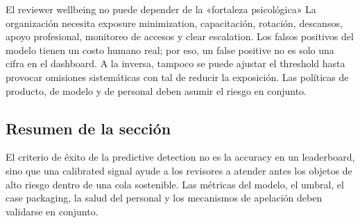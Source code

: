 \begin{warningbox}{El reviewer wellbeing no puede depender de la «fortaleza psicológica»}
La organización necesita exposure minimization, capacitación, rotación, descansos, apoyo profesional, monitoreo de accesos y clear escalation. Los falsos positivos del modelo tienen un costo humano real; por eso, un false positive no es solo una cifra en el dashboard. A la inversa, tampoco se puede ajustar el threshold hasta provocar omisiones sistemáticas con tal de reducir la exposición. Las políticas de producto, de modelo y de personal deben asumir el riesgo en conjunto.
\end{warningbox}

\subsection{Resumen de la sección}

El criterio de éxito de la predictive detection no es la accuracy en un leaderboard, sino que una calibrated signal ayude a los revisores a atender antes los objetos de alto riesgo dentro de una cola sostenible. Las métricas del modelo, el umbral, el case packaging, la salud del personal y los mecanismos de apelación deben validarse en conjunto.
